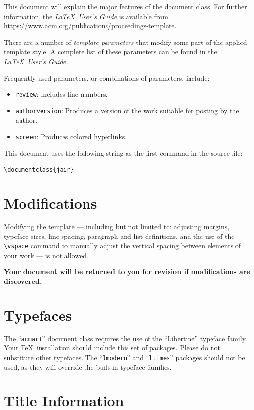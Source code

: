 \documentclass[]{jair}
\begin{document}
This document will explain the major features of the document
class. For further information, the {\itshape \LaTeX\ User's Guide} is
available from
\url{https://www.acm.org/publications/proceedings-template}.

There are a number of {\itshape template parameters}
that modify some part of the applied template style. A complete list
of these parameters can be found in the {\itshape \LaTeX\ User's Guide.}

Frequently-used parameters, or combinations of parameters, include:
\begin{itemize}
\item {\texttt{review}}: Includes line
  numbers.
\item{\texttt{authorversion}}: Produces a version of the work suitable
  for posting by the author.
\item{\texttt{screen}}: Produces colored hyperlinks.
\end{itemize}

This document uses the following string as the first command in the
source file:
\begin{verbatim}
\documentclass{jair}
\end{verbatim}

\section{Modifications}

Modifying the template --- including but not limited to: adjusting
margins, typeface sizes, line spacing, paragraph and list definitions,
and the use of the \verb|\vspace| command to manually adjust the
vertical spacing between elements of your work --- is not allowed.

{\bfseries Your document will be returned to you for revision if
  modifications are discovered.}

\section{Typefaces}

The ``\verb|acmart|'' document class requires the use of the
``Libertine'' typeface family. Your \TeX\ installation should include
this set of packages. Please do not substitute other typefaces. The
``\verb|lmodern|'' and ``\verb|ltimes|'' packages should not be used,
as they will override the built-in typeface families.

\section{Title Information}
\end{document}
